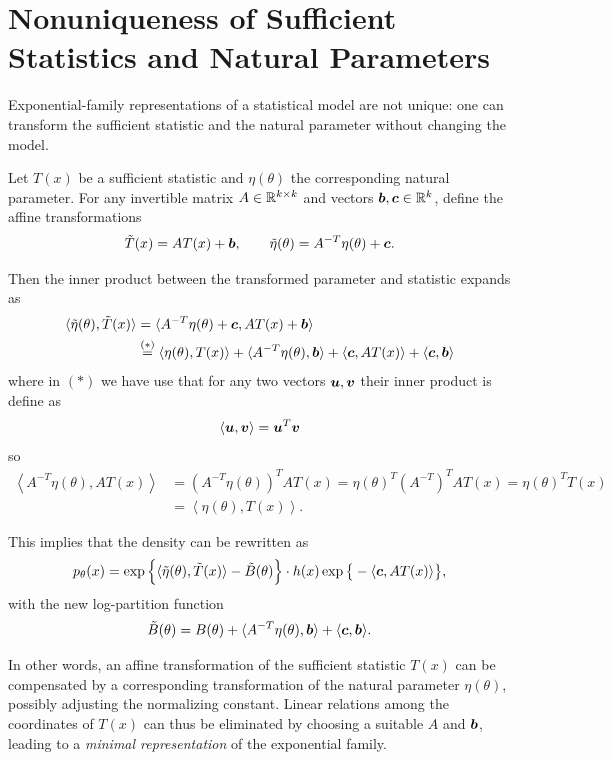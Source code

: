 \section{Nonuniqueness of Sufficient Statistics and Natural Parameters}%
\label{sec:nssnp}

Exponential-family representations of a statistical model are not unique: one can transform the sufficient statistic and the natural parameter without changing the model. 

\medskip
Let \(T(x)\) be a sufficient statistic and \(\eta(\theta)\) the corresponding natural parameter. For any invertible matrix \(A \in \mathbb{R}^{k \times k}\) and vectors \(\boldsymbol{b}, \boldsymbol{c} \in \mathbb{R}^k\), define the affine transformations
\[
\tilde{T}(x) = A T(x) + \boldsymbol{b}, \qquad 
\tilde{\eta}(\theta) = A^{-T} \eta(\theta) + \boldsymbol{c}.
\]

Then the inner product between the transformed parameter and statistic expands as
\begin{align*}
\langle \tilde{\eta}(\theta), \tilde{T}(x) \rangle 
&= \langle A^{-T}\eta(\theta) + \boldsymbol{c}, A T(x) + \boldsymbol{b} \rangle \\
&\overset{(*)}{=} \langle \eta(\theta), T(x) \rangle 
+ \langle A^{-T}\eta(\theta), \boldsymbol{b} \rangle 
+ \langle \boldsymbol{c}, A T(x) \rangle 
+ \langle \boldsymbol{c}, \boldsymbol{b} \rangle
\end{align*}
where in \((*)\) we have use that for any two vectors \(\boldsymbol{u }, \boldsymbol{v }\) their inner product is define as 
\[
    \left<\boldsymbol{u }, \boldsymbol{v } \right> = \boldsymbol{u }^{T}\boldsymbol{v}
\]
so 
\begin{align*}
    \left<A^{-T}\eta(\theta), AT(x) \right>
    &= (A^{-T}\eta(\theta))^{T}AT(x)
    = \eta(\theta)^{T}(A^{-T})^{T}AT(x) 
    = \eta(\theta)^{T}T(x)
    \\
    &= \left<\eta(\theta),T(x) \right>.
\end{align*}

\medskip
This implies that the density can be rewritten as
\[
p_\theta(x)
= \exp\Big\{ \langle \tilde{\eta}(\theta), \tilde{T}(x) \rangle - \tilde{B}(\theta) \Big\} 
  \cdot h(x) \exp\big\{- \langle \boldsymbol{c}, A T(x) \rangle\big\},
\]
with the new log-partition function
\[
\tilde{B}(\theta) = B(\theta) + \langle A^{-T} \eta(\theta), \boldsymbol{b} \rangle + \langle \boldsymbol{c}, \boldsymbol{b} \rangle.
\]

\medskip
In other words, an affine transformation of the sufficient statistic \(T(x)\) can be compensated by a corresponding transformation of the natural parameter \(\eta(\theta)\), possibly adjusting the normalizing constant. Linear relations among the coordinates of \(T(x)\) can thus be eliminated by choosing a suitable \(A\) and \(\boldsymbol{b}\), leading to a \emph{minimal representation} of the exponential family.  

